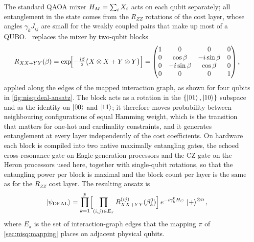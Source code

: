 The standard QAOA mixer $H_M=\sum_{i}X_{i}$ acts on each qubit separately; all entanglement in the state comes from the $R_{ZZ}$ rotations of the cost layer, whose angles $\gamma_{k}J_{ij}$ are small for the weakly coupled pairs that make up most of a QUBO. \deal\ replaces the mixer by two-qubit blocks
\begin{equation}\label{eq:nisq:mixer}
  R_{XX+YY}(\beta) = \exp\!\Bigl[-\tfrac{i\beta}{2}\bigl(X\otimes X + Y\otimes Y\bigr)\Bigr]
  = \begin{pmatrix} 1 & 0 & 0 & 0\\ 0 & \cos\beta & -i\sin\beta & 0\\ 0 & -i\sin\beta & \cos\beta & 0\\ 0&0&0&1\end{pmatrix},
\end{equation}
applied along the edges of the mapped interaction graph, as shown for four qubits in \cref{fig:nisq:deal-ansatz}. The block acts as a rotation in the $\{\ket{01},\ket{10}\}$ subspace and as the identity on $\ket{00}$ and $\ket{11}$; it therefore moves probability between neighbouring configurations of equal Hamming weight, which is the transition that matters for one-hot and cardinality constraints, and it generates entanglement at every layer independently of the cost coefficients. On hardware each block is compiled into two native maximally entangling gates, the echoed cross-resonance gate on Eagle-generation processors \cite{sheldon2016ecr} and the CZ gate on the Heron processors used here, together with single-qubit rotations, so that the entangling power per block is maximal and the block count per layer is the same as for the $R_{ZZ}$ cost layer. The resulting ansatz is
\begin{equation}\label{eq:nisq:deal-state}
  \ket{\psi_{\mathrm{DEAL}}} = \prod_{k=1}^{p}\Bigl[\prod_{(i,j)\in E_{\pi}} R^{(ij)}_{XX+YY}(\beta_{k}^{0})\Bigr]\, e^{-i\gamma_{k}^{0}H_C}\, \ket{+}^{\otimes n},
\end{equation}
where $E_{\pi}$ is the set of interaction-graph edges that the mapping $\pi$ of \cref{sec:nisq:mapping} places on adjacent physical qubits.

